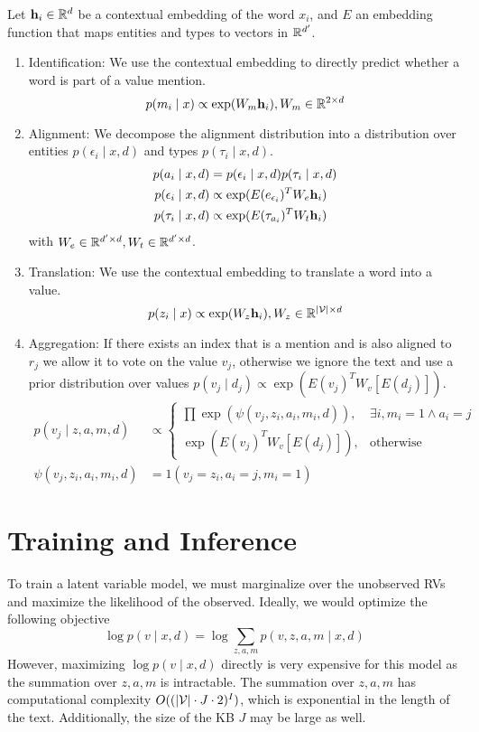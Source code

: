 \documentclass[12pt]{article}
\begin{document}
Let $\mathbf{h}_i \in \mathbb{R}^d$ be a contextual embedding of the word $x_i$,
and $E$ an embedding function that maps entities and types to vectors in $\mathbb{R}^{d'}$.
\begin{enumerate}
\item Identification: We use the contextual embedding to directly predict
whether a word is part of a value mention.
$$p(m_i \mid x) \propto \exp(W_m\mathbf{h}_i), W_m \in \mathbb{R}^{2 \times d}$$
\item Alignment: We decompose the alignment distribution into a distribution over
entities $p(\epsilon_i \mid x,d)$ and types $p(\tau_i \mid x,d)$.
\begin{align*}
p(a_i \mid x,d) &= p(\epsilon_i \mid x,d)p(\tau_i \mid x,d)\\
p(\epsilon_i \mid x,d) &\propto \exp(E(e_{\epsilon_i})^T W_e \mathbf{h}_i)\\
p(\tau_i \mid x,d) &\propto \exp(E(\tau_{a_i})^T W_t \mathbf{h}_i)
\end{align*}
with $W_e \in \mathbb{R}^{d' \times d},W_t \in \mathbb{R}^{d' \times d}$.
\item Translation: We use the contextual embedding to translate a word
into a value.
$$p(z_i \mid x) \propto \exp(W_z \mathbf{h}_i), W_z \in \mathbb{R}^{|\mathcal{V}| \times d}$$
\item Aggregation:
If there exists an index that is a mention and is also aligned to $r_j$
we allow it to vote on the value $v_j$, otherwise we ignore the text
and use a prior distribution over values
$p(v_j \mid d_j) \propto \exp(E(v_j)^TW_v [E(d_j)])$.
\begin{align*}
p(v_j \mid z,a,m,d) &\propto \begin{cases}
    \prod \exp(\psi(v_j, z_i,a_i,m_i,d)),  & \exists i, m_i = 1 \wedge a_i = j\\
    \exp(E(v_j)^TW_v [E(d_j)]), & \textrm{otherwise}
\end{cases}\\
\psi(v_j, z_i, a_i, m_i,d) &= 1(v_j = z_i, a_i = j, m_i=1)%
\end{align*}
\end{enumerate}

\section{Training and Inference}
To train a latent variable model, we must marginalize over the unobserved RVs
and maximize the likelihood of the observed.
Ideally, we would optimize the following objective
\begin{equation}
\log p(v \mid x,d) = \log \sum_{z,a,m} p(v,z,a,m \mid x,d)
\end{equation}
However, maximizing $\log p(v \mid x,d)$ directly is very expensive for this model
as the summation over $z,a,m$ is intractable.
The summation over $z,a,m$ has computational complexity $O((|\mathcal{V}|\cdot J\cdot 2)^{I})$,
which is exponential in the length of the text.
Additionally, the size of the KB $J$ may be large as well.
\end{document}
